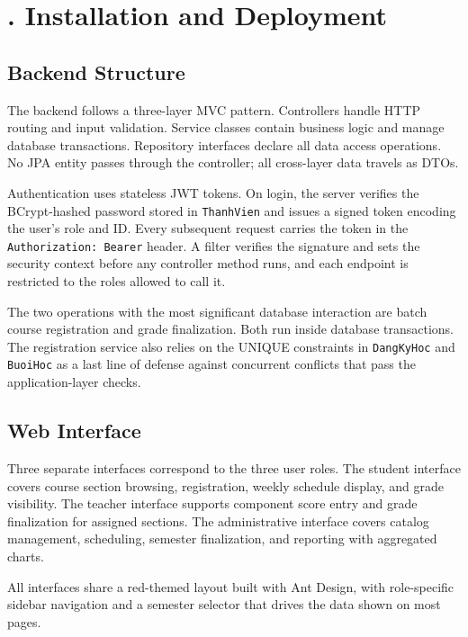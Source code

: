 \documentclass[12pt,a4paper]{report}
\begin{document}
\chapter{. Installation and Deployment}

\section{Backend Structure}

The backend follows a three-layer MVC pattern. Controllers handle HTTP routing and input validation. Service classes contain business logic and manage database transactions. Repository interfaces declare all data access operations. No JPA entity passes through the controller; all cross-layer data travels as DTOs.

Authentication uses stateless JWT tokens. On login, the server verifies the BCrypt-hashed password stored in \texttt{ThanhVien} and issues a signed token encoding the user's role and ID. Every subsequent request carries the token in the \texttt{Authorization: Bearer} header. A filter verifies the signature and sets the security context before any controller method runs, and each endpoint is restricted to the roles allowed to call it.

The two operations with the most significant database interaction are batch course registration and grade finalization. Both run inside database transactions. The registration service also relies on the UNIQUE constraints in \texttt{DangKyHoc} and \texttt{BuoiHoc} as a last line of defense against concurrent conflicts that pass the application-layer checks.

\section{Web Interface}

Three separate interfaces correspond to the three user roles. The student interface covers course section browsing, registration, weekly schedule display, and grade visibility. The teacher interface supports component score entry and grade finalization for assigned sections. The administrative interface covers catalog management, scheduling, semester finalization, and reporting with aggregated charts.

All interfaces share a red-themed layout built with Ant Design, with role-specific sidebar navigation and a semester selector that drives the data shown on most pages.
\end{document}
